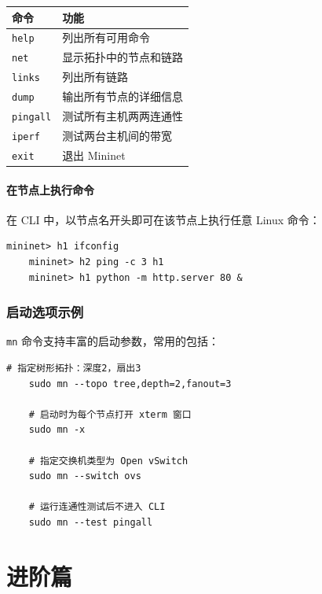 \documentclass[12pt,a4paper,openany]{ctexbook}
\begin{document}
\begin{center}
	\begin{tabular}{@{}ll@{}}
		\toprule
		\textbf{命令} & \textbf{功能} \\
		\midrule
		\texttt{help} & 列出所有可用命令 \\
		\texttt{net} & 显示拓扑中的节点和链路 \\
		\texttt{links} & 列出所有链路 \\
		\texttt{dump} & 输出所有节点的详细信息 \\
		\texttt{pingall} & 测试所有主机两两连通性 \\
		\texttt{iperf} & 测试两台主机间的带宽 \\
		\texttt{exit} & 退出 Mininet \\
		\bottomrule
	\end{tabular}
\end{center}

\subsection{在节点上执行命令}

在 CLI 中，以节点名开头即可在该节点上执行任意 Linux 命令：

\begin{lstlisting}[style=bashstyle]
	mininet> h1 ifconfig
	mininet> h2 ping -c 3 h1
	mininet> h1 python -m http.server 80 &
\end{lstlisting}

\section{启动选项示例}

\texttt{mn} 命令支持丰富的启动参数，常用的包括：

\begin{lstlisting}[style=bashstyle]
	# 指定树形拓扑：深度2，扇出3
	sudo mn --topo tree,depth=2,fanout=3
	
	# 启动时为每个节点打开 xterm 窗口
	sudo mn -x
	
	# 指定交换机类型为 Open vSwitch
	sudo mn --switch ovs
	
	# 运行连通性测试后不进入 CLI
	sudo mn --test pingall
\end{lstlisting}


\part{进阶篇}

\end{document}
